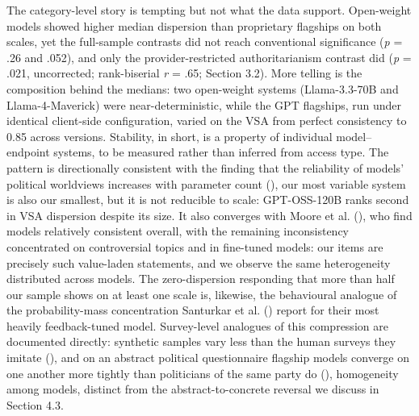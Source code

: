 \documentclass[
]{article}
\begin{document}
The category-level story is tempting but not what the data support.
Open-weight models showed higher median dispersion than proprietary
flagships on both scales, yet the full-sample contrasts did not reach
conventional significance (\emph{p} = .26 and .052), and only the
provider-restricted authoritarianism contrast did (\emph{p} = .021,
uncorrected; rank-biserial \emph{r} = .65; Section 3.2). More telling is
the composition behind the medians: two open-weight systems
(Llama-3.3-70B and Llama-4-Maverick) were near-deterministic, while the
GPT flagships, run under identical client-side configuration, varied on
the VSA from perfect consistency to 0.85 across versions. Stability, in
short, is a property of individual model--endpoint systems, to be
measured rather than inferred from access type. The pattern is
directionally consistent with the finding that the reliability of
models' political worldviews increases with parameter count
(), our most variable system
is also our smallest, but it is not reducible to scale: GPT-OSS-120B
ranks second in VSA dispersion despite its size. It also converges with
Moore et al. (), who find models
relatively consistent overall, with the remaining inconsistency
concentrated on controversial topics and in fine-tuned models: our items
are precisely such value-laden statements, and we observe the same
heterogeneity distributed across models. The zero-dispersion responding
that more than half our sample shows on at least one scale is, likewise,
the behavioural analogue of the probability-mass concentration Santurkar
et al. () report for their most
heavily feedback-tuned model. Survey-level analogues of this compression
are documented directly: synthetic samples vary less than the human
surveys they imitate (),
and on an abstract political questionnaire flagship models converge on
one another more tightly than politicians of the same party do
(), homogeneity among
models, distinct from the abstract-to-concrete reversal we discuss in
Section 4.3.
\end{document}
